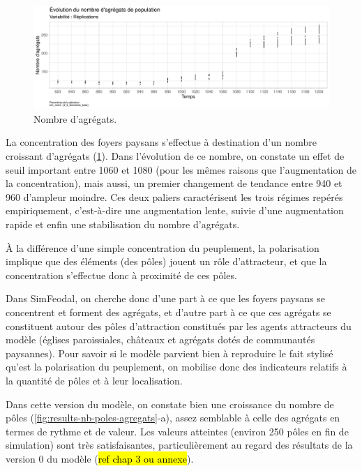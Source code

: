 \begin{figure}[H]
	\centering
	\includegraphics[width=\linewidth]{img/results_6_6/Agregats_Nb_Haut.pdf}
	\caption{Nombre d'agrégats.}
	\label{fig:results-nb-agregrats}
\end{figure}

La concentration des foyers paysans s'effectue à destination d'un nombre croissant d'agrégats (\cref{fig:results-nb-agregrats}).
Dans l'évolution de ce nombre, on constate un effet de seuil important entre 1060 et 1080 (pour les mêmes raisons que l'augmentation de la concentration), mais aussi, un premier changement de tendance entre 940 et 960 d'ampleur moindre.
Ces deux paliers caractérisent les trois régimes repérés empiriquement, c'est-à-dire une augmentation lente, suivie d'une augmentation rapide et enfin une stabilisation du nombre d'agrégats.

À la différence d'une simple concentration du peuplement, la polarisation implique que des éléments (des pôles) jouent un rôle d'attracteur, et que la concentration s'effectue donc à proximité de ces pôles.

Dans SimFeodal, on cherche donc d'une part à ce que les foyers paysans se concentrent et forment des agrégats, et d'autre part à ce que ces agrégats se constituent autour des pôles d'attraction constitués par les agents attracteurs du modèle (églises paroissiales, châteaux et agrégats dotés de communautés paysannes).
Pour savoir si le modèle parvient bien à reproduire le fait stylisé qu'est la polarisation du peuplement, on mobilise donc des indicateurs relatifs à la quantité de pôles et à leur localisation.

Dans cette version du modèle, on constate bien une croissance du nombre de pôles (\cref{fig:results-nb-poles-agregats}-a), assez semblable à celle des agrégats en termes de rythme et de valeur.
Les valeurs atteintes (environ 250 pôles en fin de simulation) sont très satisfaisantes, particulièrement au regard des résultats de la version 0 du modèle (\hl{ref chap 3 ou annexe}).

